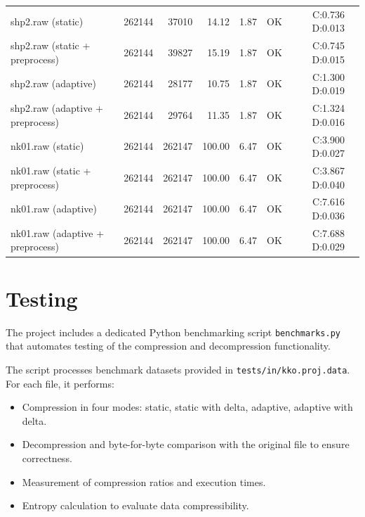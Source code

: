 \documentclass[a4paper,12pt]{article}
\begin{document}
{\begin{tabular}{lrrrrrrr}
            shp2.raw (static)                  & 262144      & 37010         & 14.12     & 1.87    & OK  & C:0.736 D:0.013 \\
            shp2.raw (static + preprocess)     & 262144      & 39827         & 15.19     & 1.87    & OK  & C:0.745 D:0.015 \\
            shp2.raw (adaptive)                & 262144      & 28177         & 10.75     & 1.87    & OK  & C:1.300 D:0.019 \\
            shp2.raw (adaptive + preprocess)   & 262144      & 29764         & 11.35     & 1.87    & OK  & C:1.324 D:0.016 \\
            nk01.raw (static)                  & 262144      & 262147        & 100.00    & 6.47    & OK  & C:3.900 D:0.027 \\
            nk01.raw (static + preprocess)     & 262144      & 262147        & 100.00    & 6.47    & OK  & C:3.867 D:0.040 \\
            nk01.raw (adaptive)                & 262144      & 262147        & 100.00    & 6.47    & OK  & C:7.616 D:0.036 \\
            nk01.raw (adaptive + preprocess)   & 262144      & 262147        & 100.00    & 6.47    & OK  & C:7.688 D:0.029 \\
            \hline
        \end{tabular}
    }



    \section{Testing}

    The project includes a dedicated Python benchmarking script \texttt{benchmarks.py} that automates testing of the
    compression and decompression functionality.

    The script processes benchmark datasets provided in \texttt{tests/in/kko.proj.data}. For each file, it performs:

    \begin{itemize}
        \item Compression in four modes: static, static with delta, adaptive, adaptive with delta.
        \item Decompression and byte-for-byte comparison with the original file to ensure correctness.
        \item Measurement of compression ratios and execution times.
        \item Entropy calculation to evaluate data compressibility.
    \end{itemize}
\end{document}
